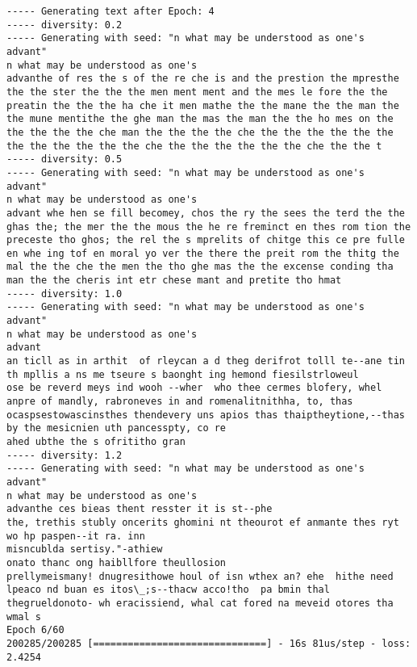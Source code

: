\documentclass[11pt]{article}
\begin{document}
\begin{Verbatim}[commandchars=\\\{\}]
----- Generating text after Epoch: 4
----- diversity: 0.2
----- Generating with seed: "n what may be understood as one's
advant"
n what may be understood as one's
advanthe of res the s of the re che is and the prestion the mpresthe the the ster the the the men ment ment and the mes le fore the the preatin the the the ha che it men mathe the the mane the the man the the mune mentithe the ghe man the mas the man the the ho mes on the the the the the che man the the the the che the the the the the the the the the the the the che the the the the the the che the the t
----- diversity: 0.5
----- Generating with seed: "n what may be understood as one's
advant"
n what may be understood as one's
advant whe hen se fill becomey, chos the ry the sees the terd the the ghas the; the mer the the mous the he re freminct en thes rom tion the preceste tho ghos; the rel the s mprelits of chitge this ce pre fulle en whe ing tof en moral yo ver the there the preit rom the thitg the mal the the che the men the tho ghe mas the the excense conding tha man the the cheris int etr chese mant and pretite tho hmat
----- diversity: 1.0
----- Generating with seed: "n what may be understood as one's
advant"
n what may be understood as one's
advant
an ticll as in arthit  of rleycan a d theg derifrot tolll te--ane tin th mpllis a ns me tseure s baonght ing hemond fiesilstrloweul
ose be reverd meys ind wooh --wher  who thee cermes blofery, whel anpre of mandly, rabroneves in and romenalitnithha, to, thas ocaspsestowascinsthes thendevery uns apios thas thaiptheytione,--thas by the mesicnien uth pancesspty, co re
ahed ubthe the s ofrititho gran
----- diversity: 1.2
----- Generating with seed: "n what may be understood as one's
advant"
n what may be understood as one's
advanthe ces bieas thent resster it is st--phe
the, trethis stubly oncerits ghomini nt theourot ef anmante thes ryt wo hp paspen--it ra. inn
misncublda sertisy."-athiew
onato thanc ong haibllfore theullosion
prellymeismany! dnugresithowe houl of isn wthex an? ehe  hithe need lpeaco nd buan es itos\_;s--thacw acco!tho  pa bmin thal thegrueldonoto- wh eracissiend, whal cat fored na meveid otores tha wmal s
Epoch 6/60
200285/200285 [==============================] - 16s 81us/step - loss: 2.4254


\end{Verbatim}
\end{document}
